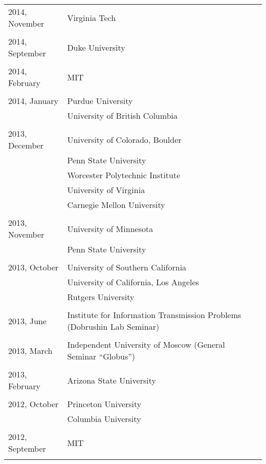 \documentclass[letterpaper,11pt]{article}
\begin{document}
\begin{longtable}{llc}
	2014, November
	& Virginia Tech\\\\

	2014, September
	& Duke University\\\\

	2014, February
	& MIT\\\\

	2014, January
	  & Purdue University & \hspace{110pt}
	\\& University of British Columbia \\\\

	2013, December
	& University of Colorado, Boulder
	\\&Penn State University\\&Worcester Polytechnic Institute
	\\&University of Virginia\\&
	Carnegie Mellon University \\\\

	2013, November&
	University of Minnesota \\&
	Penn State University \\\\

	2013, October&
	University of Southern California
	\\&
	University of California, Los Angeles
	\\&Rutgers University\\\\

	2013, June& Institute for Information Transmission Problems
	(Dobrushin Lab Seminar)\\\\

	2013, March& Independent University of Moscow (General Seminar
	``Globus'')\\\\

	2013, February & Arizona State University\\\\

	2012, October & Princeton University \\
	& Columbia University\\\\

	2012, September & MIT \\\\


\end{longtable}
\end{document}
